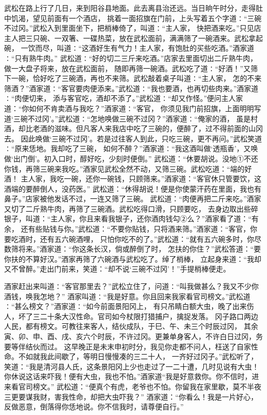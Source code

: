 \documentclass[12pt,UTF8]{ctexbook}
\begin{document}
武松在路上行了几日，来到阳谷县地面。此去离县治还远。当日晌午时分，走得肚中饥渴，望见前面有一个酒店，
挑着一面招旗在门前，上头写着五个字道∶“三碗不过冈。”武松入到里面坐下，把梢棒倚了，叫道∶“主人家，
快把酒来吃。”只见店主人把三只碗、一双箸、一碟热菜，放在武松面前，满满筛了一碗酒来。武松拿起碗，
一饮而尽，叫道∶“这酒好生有气力！主人家，有饱肚的买些吃酒。”酒家道∶“只有熟牛肉。”
武松道∶“好的切二三斤来吃酒。”店家去里面切出二斤熟牛肉，做一大盘子将来，放在武松面前，
随即再筛一碗酒。武松吃了道∶“好酒！”又筛下一碗，恰好吃了三碗酒，再也不来筛。武松敲着桌子叫道∶“主人家，
怎的不来筛酒？”酒家道∶“客官要肉便添来。”武松道∶“我也要酒，也再切些肉来。”酒家道∶“肉便切来，
添与客官吃，酒却不添了。”武松道∶“却又作怪。”便问主人家道：“你如何不肯卖酒与我吃？”酒家道∶“客官，
你须见我门前招旗，上面明明写道‘三碗不过冈’。”武松道∶“怎地唤做三碗不过冈？”酒家道∶“俺家的酒，
虽是村酒，却比老酒的滋味。但凡客人来我店中吃了三碗的，便醉了，过不得前面的山冈去。
因此唤做‘三碗不过冈’。若是过往客人到此，只吃三碗，更不再问。”武松笑道∶“原来恁地。我却吃了三碗，
如何不醉？”酒家道∶“我这酒叫做‘透瓶香’，又唤做‘出门倒’。初入口时，醇好吃，少刻时便倒。”
武松道：“休要胡说。没地①不还你钱，再筛三碗来我吃。”酒家见武松全然不动，又筛三碗。武松吃道：“端的好酒！
主人家，我吃一碗，还你一碗钱，只顾筛来。”酒家道：“客官休只管要饮，这酒端的要醉倒人，没药医。”
武松道：“休得胡说！便是你使蒙汗药在里面，我也有鼻子。”店家被他发话不过，一连又筛了三碗。
武松道：“肉便再把二斤来吃。”酒家又切了二斤熟牛肉，再筛了三碗酒。武松吃得口滑，只顾要吃，
去身边取出些碎银子，叫道：“主人家，你且来看我银子，还你酒肉钱勾②么？”酒家看了道：“有余，
还有些贴钱与你。”武松道：“不要你贴钱，只将酒来筛。”酒家道：“客官，你要吃酒时，还有五六碗酒哩，
只怕你吃不的了。”武松道：“就有五六碗多时，你尽数筛将来。”酒家道：“你这条长汉，倘或醉倒了时，
怎扶的你住？”武松答道：“要你扶的不算好汉。”酒家再筛了六碗酒与武松吃了。绰了梢棒，
立起身来道：“我却又不曾醉。”走出门前来，笑道：“却不说‘三碗不过冈’！”手提梢棒便走。

酒家赶出来叫道∶“客官那里去？”武松立住了，问道∶“叫我做甚么？我又不少你酒钱，唤我怎地？”
酒家叫道∶“我是好意。你且回来我家看官司榜文。”武松道∶“甚么榜文？”酒家道∶“如今前面景阳冈上，
有只吊睛白额大虫，晚了出来伤人，坏了三二十条大汉性命。官司如今杖限打猎捕户，擒捉发落。
冈子路口两边人民，都有榜文。可教往来客人，结伙成队，于巳、午、未三个时辰过冈，
其余寅、卯、申、酉、戌、亥六个时辰，不许过冈。更兼单身客人，不许白日过冈，务要等伴结伙而过。
这早晚正是未末申初时分，我见你走都不问人，枉送了自家性命。不如就我此间歇了，等明日慢慢凑的三二十人，
一齐好过冈子。”武松听了，笑道：“我是清河县人氏，这条景阳冈上少也走过了一二十遭，几时见说有大虫！
你休说这话来吓我！便有大虫，我也不怕。”酒家道“我是好意救你。你不信时，进来看官司榜文。”
武松道：“便真个有虎，老爷也不怕。你留我在家里歇，莫不半夜三更要谋我财，害我性命，却把大虫吓我？”
酒家道：“你看么！我是一片好心，反做恶意，倒落得你恁地说。你不信我时，请尊便自行。”
\end{document}
